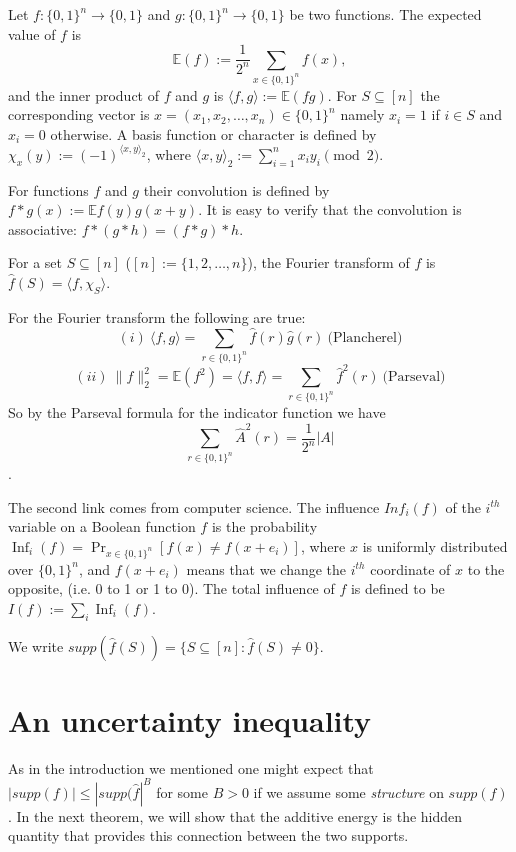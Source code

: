 \documentclass[12pt]{amsart}%
\DeclareMathOperator{\Inf}{Inf}
\theoremstyle{definition}
\begin{document}
Let $f: \{0,1\}^n \to \{0,1\}$ and $g: \{0,1\}^n \to \{0,1\}$  be two functions. The expected value of $f$ is
$$
\mathbb{E}(f):=\frac{1}{2^n}\sum_{x\in \{0,1\}^n}f(x),
$$
and the inner product of $f$ and $g$ is $\langle f,g\rangle:=\mathbb{E}(fg)$. For $S\subseteq [n]$ the corresponding  vector is $x=(x_1,x_2,\dots,x_n)\in \{0,1\}^n$ namely $x_i=1$ if $i\in S$ and $x_i=0$ otherwise. A basis function or character is defined by $\chi_x(y):=(-1)^{\langle x,y\rangle_2}$, where $\langle x,y\rangle_2:=\sum_{i=1}^nx_iy_i \pmod 2$.

For functions $f$ and $g$ their convolution is defined by $f\ast g (x):=\mathbb{E}f(y)g(x+y)$.
It is easy to verify that the convolution is associative: $f\ast (g\ast h)=(f\ast g)\ast h$.

For a set $S\subseteq [n]$ ($[n]:=\{1,2,\dots,n\}$), the Fourier transform of $f$ is $\widehat{f}(S)=\langle f,\chi_S\rangle$.

For the Fourier transform the following are true:
$$
(i)\  \langle f,g\rangle =\sum_{r\in \{0,1\}^n}\widehat{f}(r)\widehat{g}(r) \ \text{(Plancherel)}
$$
$$
(ii) \ \|f\|_2^2=\mathbb{E}(f^2)=\langle f,f\rangle = \sum_{r\in \{0,1\}^n}\widehat{f}^2(r) \ \text{(Parseval)}
$$
So by the Parseval formula for the indicator function we have 
\begin{equation}\label{Par}
\sum_{r\in \{0,1\}^n}\widehat{A}^2(r)=\frac{1}{2^n}|A|
\end{equation}.

The second link comes from computer science. The influence $Inf_i(f)$ of the $i^{th}$ variable on a Boolean function $f$ is the probability $\Inf_i(f)=\Pr_{x\in \{0,1\}^n}[f(x)\neq f(x+e_i)]$, where $x$ is uniformly distributed over $\{0,1\}^n$, and $f(x+e_i)$ means that we change the $i^{th}$ coordinate of $x$ to the opposite, (i.e. 0 to 1 or 1 to 0). The total influence of $f$ is defined to be $I(f):=\sum_i \Inf_i(f)$.

We write $supp(\widehat{f}(S))=\{S\subseteq [n]: \widehat{f}(S)\neq 0\}$.





\section{An uncertainty inequality}
\label{sec:uncert}

As in the introduction we mentioned one might expect that $|supp(f)|\leq |supp(\widehat{f}|^B$ for some $B>0$ if we assume some {\it structure} on $supp(f)$. In the next theorem, we will show that the additive energy is the hidden quantity that provides this connection between the two supports. 
\end{document}
